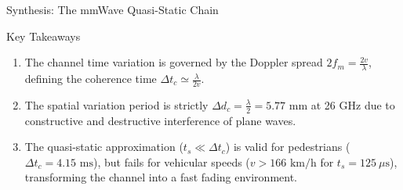 \documentclass[aspectratio=169, 10pt]{beamer}
\begin{document}
\begin{frame}{Synthesis: The mmWave Quasi-Static Chain}
    \vspace{0.3cm}
    \begin{block}{Key Takeaways}
        \begin{enumerate}
            \item The channel time variation is governed by the Doppler spread $2f_m = \frac{2v}{\lambda}$, defining the coherence time $\Delta t_c \simeq \frac{\lambda}{2v}$.
            \item The spatial variation period is strictly $\Delta d_c = \frac{\lambda}{2} = 5.77\text{ mm}$ at 26 GHz due to constructive and destructive interference of plane waves.
            \item The quasi-static approximation ($t_s \ll \Delta t_c$) is valid for pedestrians ($\Delta t_c = 4.15\text{ ms}$), but fails for vehicular speeds ($v > 166\text{ km/h}$ for $t_s = 125\ \mu\text{s}$), transforming the channel into a fast fading environment.
        \end{enumerate}
    \end{block}
\end{frame}
\end{document}
